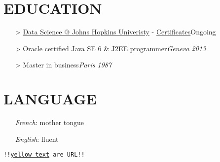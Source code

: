 \documentclass{res}
\begin{document}
\begin{resume}
\section{EDUCATION} 
\begin{enumerate}[leftmargin=0cm]
\item[>]\href{https://www.coursera.org/specialization/jhudatascience/1?utm_medium=dashboard}{Data Science @ Johns Hopkins Univeristy} - \href{https://www.coursera.org/verify/465JD8J3WM}{Certificates}\hfill Ongoing
\item[>]Oracle certified Java SE 6 \& J2EE programmer\hfill \textit{Geneva 2013}
\item[>]Master in business\hfill \textit{Paris 1987}
\end{enumerate}					

\section{LANGUAGE}
\begin{enumerate}[leftmargin=0cm]					
\item[]\textit{French}: mother tongue
\item[]\textit{English}: fluent
\end{enumerate}

\centerline{\texttt{!!\textcolor{myyellow}{\href{https://www.google.fr/}{yellow text}} are URL!!}}


\end{resume}
\end{document}
